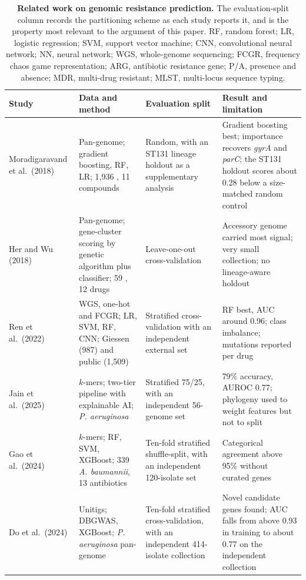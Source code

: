 \begin{table}[t]\centering\footnotesize
\caption{\textbf{Related work on genomic resistance prediction.} The evaluation-split column
records the partitioning scheme as each study reports it, and is the property most relevant to the
argument of this paper. RF, random forest; LR, logistic regression; SVM, support vector machine;
CNN, convolutional neural network; NN, neural network; WGS, whole-genome sequencing; FCGR,
frequency chaos game representation; ARG, antibiotic resistance gene; P/A, presence and absence;
MDR, multi-drug resistant; MLST, multi-locus sequence typing.}
\label{tab:summary}
\begin{tabularx}{\linewidth}{p{2.4cm}p{4.2cm}p{3.0cm}X}
\toprule
Study & Data and method & Evaluation split & Result and limitation \\
\midrule
Moradigaravand et al.\ (2018) \cite{moradigaravand2018prediction} & Pan-genome; gradient boosting, RF, LR; 1,936 \Ecoli{}, 11 compounds & Random, with an ST131 lineage holdout as a supplementary analysis & Gradient boosting best; importance recovers \textit{gyrA} and \textit{parC}; the ST131 holdout scores about 0.28 below a size-matched random control \\
Her and Wu (2018) \cite{her2018pangenome} & Pan-genome; gene-cluster scoring by genetic algorithm plus classifier; 59 \Ecoli{}, 12 drugs & Leave-one-out cross-validation & Accessory genome carried most signal; very small collection; no lineage-aware holdout \\
Ren et al.\ (2022) \cite{ren2022giessen} & WGS, one-hot and FCGR; LR, SVM, RF, CNN; Giessen (987) and public (1,509) \Ecoli{} & Stratified cross-validation with an independent external set & RF best, AUC around 0.96; class imbalance; mutations reported per drug \\
Jain et al.\ (2025) \cite{jain2025paeruginosa} & $k$-mers; two-tier pipeline with explainable AI; \textit{P. aeruginosa} & Stratified 75/25, with an independent 56-genome set & 79\% accuracy, AUROC 0.77; phylogeny used to weight features but not to split \\
Gao et al.\ (2024) \cite{gao2024abaumannii} & $k$-mers; RF, SVM, XGBoost; 339 \textit{A. baumannii}, 13 antibiotics & Ten-fold stratified shuffle-split, with an independent 120-isolate set & Categorical agreement above 95\% without curated genes \\
Do et al.\ (2024) \cite{do2024unitig} & Unitigs; DBGWAS, XGBoost; \textit{P. aeruginosa} pan-genome & Ten-fold stratified cross-validation, with an independent 414-isolate collection & Novel candidate genes found; AUC falls from above 0.93 in training to about 0.77 on the independent collection \\

\end{tabularx}
\end{table}
